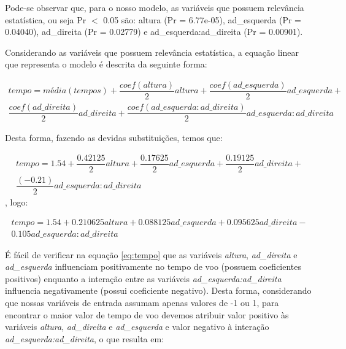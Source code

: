 Pode-se observar que, para o nosso modelo, as variáveis que possuem relevância estatística, ou seja Pr $<$ 0.05 são: altura (Pr = 6.77e-05), ad\_esquerda (Pr = 0.04040), ad\_direita (Pr = 0.02779) e ad\_esquerda:ad\_direita (Pr = 0.00901). 

Considerando as variáveis que possuem relevância estatística, a equação linear que representa o modelo é descrita da seguinte forma:

\begin{equation*}
  \begin{gathered}
    tempo = média(tempos) + \dfrac{coef(altura)}{2}altura + \dfrac{coef(ad\_esquerda)}{2}ad\_esquerda + \\ \dfrac{coef(ad\_direita)}{2}ad\_direita +  \dfrac{coef(ad\_esquerda:ad\_direita)}{2}ad\_esquerda:ad\_direita
  \end{gathered}
\end{equation*}

Desta forma, fazendo as devidas substituições, temos que:

\begin{equation*}
  \begin{gathered}
    tempo = 1.54 + \dfrac{0.42125}{2}altura + \dfrac{0.17625}{2}ad\_esquerda +  \dfrac{0.19125}{2}ad\_direita  + \\  \dfrac{(-0.21)}{2}ad\_esquerda:ad\_direita
  \end{gathered}
\end{equation*}, logo:

\begin{equation}
\begin{gathered}  
tempo = 1.54 + 0.210625altura + 0.088125ad\_esquerda + 0.095625ad\_direita - \\
0.105ad\_esquerda:ad\_direita
\label{eq:tempo}
\end{gathered}
\end{equation}



É fácil de verificar na equação \ref{eq:tempo} que as variáveis \textit{altura}, \textit{ad\_direita} e \textit{ad\_esquerda} influenciam positivamente no tempo de voo (possuem coeficientes positivos) enquanto a interação entre as variáveis \textit{ad\_esquerda:ad\_direita} influencia negativamente (possui coeficiente negativo). Desta forma, considerando que nossas variáveis de entrada assumam apenas valores de -1 ou 1, para encontrar o maior valor de tempo de voo devemos atribuir valor positivo às variáveis \textit{altura}, \textit{ad\_direita} e \textit{ad\_esquerda} e valor negativo à interação \textit{ad\_esquerda:ad\_direita}, o que resulta em:


